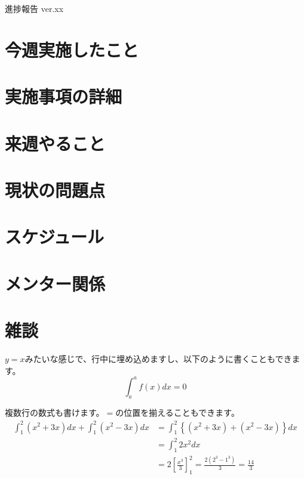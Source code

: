 \documentclass[a4paper,12pt]{ltjsarticle}
\begin{document}
\centerline{\huge 進捗報告 ver.xx}


\section{今週実施したこと}

\clearpage

\section{実施事項の詳細}

\clearpage

\section{来週やること}

\clearpage

\section{現状の問題点}

\clearpage

\section{スケジュール}

\clearpage

\section{メンター関係}

\clearpage

\section{雑談}
$y = x$みたいな感じで、行中に埋め込めますし、以下のように書くこともできます。\\

\begin{equation}
  \int_{a}^{a}f\left(x\right)dx = 0
\end{equation}

複数行の数式も書けます。$=$の位置を揃えることもできます。\\

\begin{align}
  \int_{1}^{2}\left(x^2 + 3x\right)dx + \int_{1}^{2}\left(x^2 - 3x\right)dx &= \int_{1}^{2}\left\{\left(x^2 + 3x\right) + \left(x^2 - 3x\right)\right\}dx \\
  &= \int_{1}^{2}2x^2dx \\
  &= 2\left[\frac{x^3}{3}\right]^2_1 = \frac{2\left(2^3 - 1^3\right)}{3} = \frac{14}{3}
\end{align}
\end{document}
